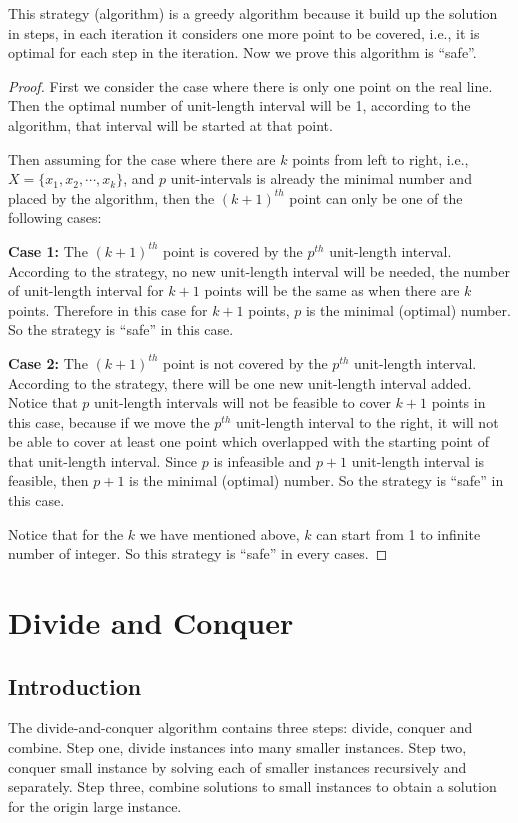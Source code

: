 						This strategy (algorithm) is a greedy algorithm because it build up the solution in steps, in each iteration it considers one more point to be covered, i.e., it is optimal for each step in the iteration. Now we prove this algorithm is ``safe''.

						\begin{proof}
							First we consider the case where there is only one point on the real line. Then the optimal number of unit-length interval will be 1, according to the algorithm, that interval will be started at that point.

							Then assuming for the case where there are $k$ points from left to right, i.e., $X = \{x_1, x_2, \cdots, x_k\}$, and $p$ unit-intervals is already the minimal number and placed by the algorithm, then the $(k+1)^{th}$ point can only be one of the following cases:

							\textbf{Case 1:} The $(k+1)^{th}$ point is covered by the $p^{th}$ unit-length interval. According to the strategy, no new unit-length interval will be needed, the number of unit-length interval for $k+1$ points will be the same as when there are $k$ points. Therefore in this case for $k+1$ points, $p$ is the minimal (optimal) number. So the strategy is ``safe'' in this case.

							\textbf{Case 2:} The $(k+1)^{th}$ point is not covered by the $p^{th}$ unit-length interval. According to the strategy, there will be one new unit-length interval added. Notice that $p$ unit-length intervals will not be feasible to cover $k+1$ points in this case, because if we move the $p^{th}$ unit-length interval to the right, it will not be able to cover at least one point which overlapped with the starting point of that unit-length interval. Since $p$ is infeasible and $p+1$ unit-length interval is feasible, then $p+1$ is the minimal (optimal) number. So the strategy is ``safe'' in this case.

							Notice that for the $k$ we have mentioned above, $k$ can start from 1 to infinite number of integer. So this strategy is ``safe'' in every cases.
						\end{proof}

			\section{Divide and Conquer}
				\subsection{Introduction}
					The divide-and-conquer algorithm contains three steps: divide, conquer and combine. Step one, divide instances into many smaller instances. Step two, conquer small instance by solving each of smaller instances recursively and separately. Step three, combine solutions to small instances to obtain a solution for the origin large instance.

